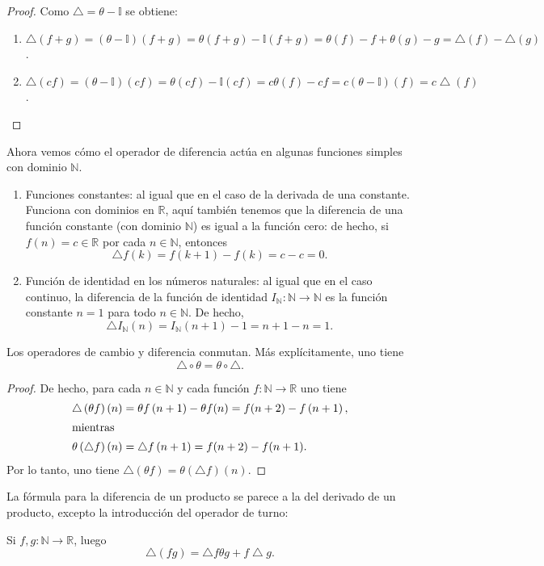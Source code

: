 \begin{proof}
	Como $ \bigtriangleup=\theta-\mathds{I}$ se obtiene:
	\begin{enumerate}
		\item $\bigtriangleup\left(f+g\right)=\left(\theta-\mathds{I}\right)\left(f+g\right)=\theta\left(f+g\right)-\mathds{I}\left(f+g\right)=\theta(f)-f+\theta(g)-g=\bigtriangleup(f)-\bigtriangleup(g)$.
		\item $\bigtriangleup\left(cf\right)=\left(\theta-\mathds{I}\right)\left(cf\right)=\theta\left(cf\right)-\mathds{I}\left(cf\right)=c\theta(f)-cf=c(\theta-\mathds{I})(f)=c\bigtriangleup(f)$.
	\end{enumerate}
\end{proof}
Ahora vemos cómo el operador de diferencia actúa en algunas funciones simples con dominio $\mathds{N}$.

\begin{example}\leavevmode
	\begin{enumerate}
		\item Funciones constantes: al igual que en el caso de la derivada de una  constante. Funciona con dominios en $\mathds{R}$, aquí también tenemos que la diferencia de una función constante (con dominio $\mathds{N}$) es igual a la función cero: de hecho, si $f(n)=c\in\mathds{R}$ por cada $n\in\mathds{N}$, entonces \[ \bigtriangleup f(k)=f(k+1)-f(k)=c-c=0. \]
		\item Función de identidad en los números naturales: al igual que en el caso continuo, la diferencia de la función de identidad $I_{\mathds{N}}\colon\mathds{N}\rightarrow \mathds{N}$ es la función constante $n=1$ para todo $n\in\mathds{N}$. De hecho, \[ \bigtriangleup I_{\mathds{N}}(n)=I_{\mathds{N}}(n+1)-1=n+1-n=1. \]
		\end{enumerate}
\end{example}

\begin{example}
	Los operadores de cambio y diferencia conmutan. Más explícitamente, uno tiene \[ \bigtriangleup\circ\theta=\theta\circ\bigtriangleup. \]
\end{example}

\begin{proof}
De hecho, para cada $n\in\mathds{N} $ y cada función $f\colon\mathds{N}\rightarrow\mathds{R}$ uno tiene
	\begin{align*}
		\bigtriangleup\left(\theta f\right)(n)&=\theta f\left(n+1\right)-\theta f(n)=f(n+2)-f\left(n+1\right),\\
		\shortintertext{mientras}
		\theta\left(\bigtriangleup f\right)(n)&=\bigtriangleup f\left(n+1\right)=f(n+2)-f(n+1).
	\end{align*}
Por lo tanto, uno tiene $\bigtriangleup\left(\theta f\right)=\theta\left(\bigtriangleup f\right)(n)$.
\end{proof}
La fórmula para la diferencia de un producto se parece a la del derivado de un producto, excepto la introducción del operador de turno:
\begin{proposition}
Si $f,g\colon\mathds{N}\rightarrow\mathds{R}$, luego \[ \bigtriangleup\left(fg\right)=\bigtriangleup f\theta g+f\bigtriangleup g. \]
\end{proposition}

